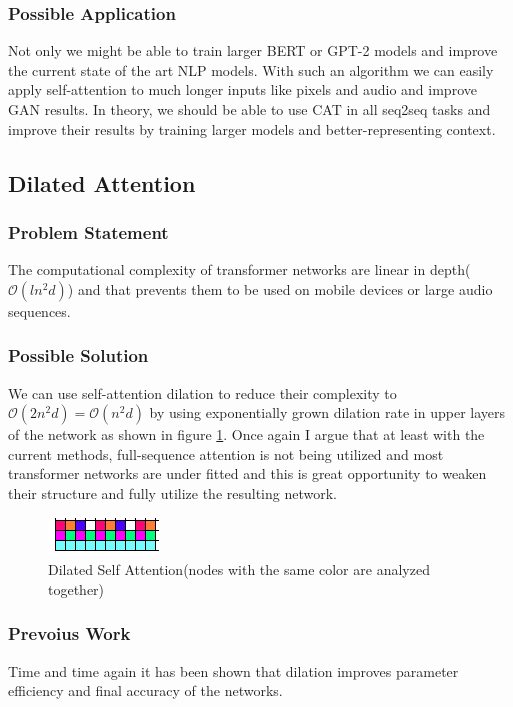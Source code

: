 \documentclass{article}
\begin{document}
\subsubsection{Possible Application}
Not only we might be able to train larger BERT\citep{1810.04805} or GPT-2 models and improve the current state of the art NLP models.
With such an algorithm we can easily apply self-attention to much longer inputs like pixels and audio and improve GAN results\citep{1805.08318}.
In theory, we should be able to use CAT in all seq2seq tasks and improve their results by training larger models and better-representing context.

\subsection{Dilated Attention}
\subsubsection{Problem Statement}
The computational complexity of transformer networks are linear in depth($\mathcal{O}(ln^{2}d)$) and that prevents them to be used on mobile devices or large audio sequences.

\subsubsection{Possible Solution}
We can use self-attention dilation to reduce their complexity to $\mathcal{O}(2n^{2}d) = \mathcal{O}(n^{2}d)$ by using exponentially grown dilation rate in upper layers of the network as shown in figure \ref{fig:dattention}. Once again I argue that at least with the current methods, full-sequence attention is not being utilized and most transformer networks are under fitted and this is great opportunity to weaken their structure and fully utilize the resulting network.

\begin{figure}[H]
  \centering
  \includegraphics[]{dilated.png}
  \caption{Dilated Self Attention(nodes with the same color are analyzed together)}
  \label{fig:dattention}
\end{figure}

\subsubsection{Prevoius Work}
Time\citep{1803.01271} and time again\citep{1710.02224} it has been shown that dilation improves parameter efficiency and final accuracy of the networks.
\end{document}
